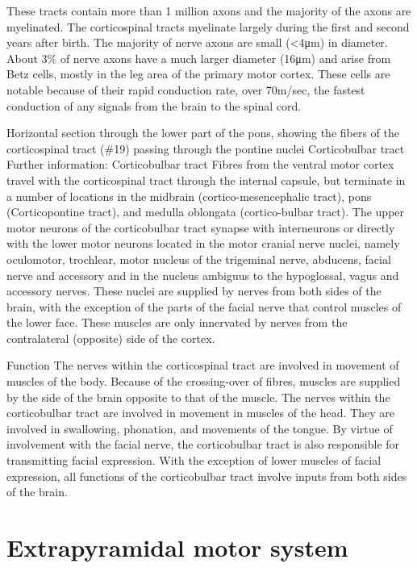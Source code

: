 \documentclass[]{book}
\begin{document}
These tracts contain more than 1 million axons and the majority of the axons are myelinated. The corticospinal tracts myelinate largely during the first and second years after birth. The majority of nerve axons are small (\textless{}4μm) in diameter. About 3\% of nerve axons have a much larger diameter (16μm) and arise from Betz cells, mostly in the leg area of the primary motor cortex. These cells are notable because of their rapid conduction rate, over 70m/sec, the fastest conduction of any signals from the brain to the spinal cord.

Horizontal section through the lower part of the pons, showing the fibers of the corticospinal tract (\#19) passing through the pontine nuclei
Corticobulbar tract
Further information: Corticobulbar tract
Fibres from the ventral motor cortex travel with the corticospinal tract through the internal capsule, but terminate in a number of locations in the midbrain (cortico-mesencephalic tract), pons (Corticopontine tract), and medulla oblongata (cortico-bulbar tract). The upper motor neurons of the corticobulbar tract synapse with interneurons or directly with the lower motor neurons located in the motor cranial nerve nuclei, namely oculomotor, trochlear, motor nucleus of the trigeminal nerve, abducens, facial nerve and accessory and in the nucleus ambiguus to the hypoglossal, vagus and accessory nerves. These nuclei are supplied by nerves from both sides of the brain, with the exception of the parts of the facial nerve that control muscles of the lower face. These muscles are only innervated by nerves from the contralateral (opposite) side of the cortex.

Function
The nerves within the corticospinal tract are involved in movement of muscles of the body. Because of the crossing-over of fibres, muscles are supplied by the side of the brain opposite to that of the muscle. The nerves within the corticobulbar tract are involved in movement in muscles of the head. They are involved in swallowing, phonation, and movements of the tongue. By virtue of involvement with the facial nerve, the corticobulbar tract is also responsible for transmitting facial expression. With the exception of lower muscles of facial expression, all functions of the corticobulbar tract involve inputs from both sides of the brain.

\hypertarget{extrapyramidal-motor-system}{%
\section{Extrapyramidal motor system}\label{extrapyramidal-motor-system}}
\end{document}
